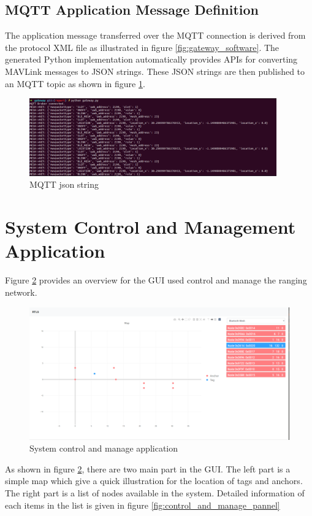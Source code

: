 \documentclass[\main/main.tex]{subfiles}
\begin{document}
\subsection{MQTT Application Message Definition}
The application message transferred over the MQTT connection is derived from the protocol XML file as illustrated in figure \ref{fig:gateway_software}. The generated Python implementation automatically provides APIs for converting MAVLink messages to JSON strings.  These JSON strings are then published to an MQTT topic as shown in figure \ref{fig:mqtt_json_string}.

\begin{figure}[H]
    \begin{center}
        \includegraphics[width=0.95\textwidth]{mqtt_json_string.png}
    \end{center}
    \caption{MQTT json string}
    \label{fig:mqtt_json_string}
\end{figure}

\section{System Control and Management Application}
Figure \ref{fig:system_control_and_manage_application} provides an overview for the GUI used control and manage the ranging network.
\begin{figure}[H]   
    \centering
    \includegraphics[width=1\textwidth]{system_control_and_manage_application.png}
    \caption{System control and manage application}
    \label{fig:system_control_and_manage_application}
\end{figure}
As shown in figure \ref{fig:system_control_and_manage_application}, there are two main part in the GUI. The left part is a simple map which give a quick illustration for the location of tags and anchors. The right part is a list of nodes available in the system. Detailed information of each items in the list is given in figure \ref{fig:control_and_manage_pannel}
\end{document}
